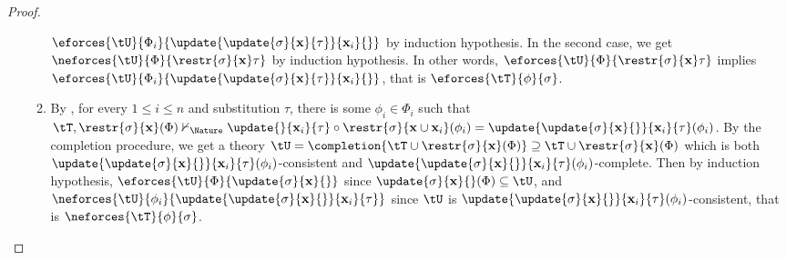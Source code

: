 \begin{proof}
\begin{itemize}
\begin{enumerate}
      $\eforces{\tU}{\Phi_i}{\update{\update{\sigma}{\mathbf{x}}{\tau}}{\mathbf{x}_i}{}}$
      by induction hypothesis. In the second case, we get
      $\neforces{\tU}{\Phi}{\restr{\sigma}{\mathbf{x}}\tau}$ by induction
      hypothesis. In other words,
      $\eforces{\tU}{\Phi}{\restr{\sigma}{\mathbf{x}}\tau}$ implies
      $\eforces{\tU}{\Phi_i}{\update{\update{\sigma}{\mathbf{x}}{\tau}}{\mathbf{x}_i}{}}$,
      that is $\eforces{\tT}{\phi}{\sigma}$.
      \item By , for every $1 \leq i \leq n$ and
      substitution $\tau$, there is some $\phi_i \in \Phi_i$ such that $\tT,
      \restr{\sigma}{\mathbf{x}}(\Phi) \nvdash_\Nature
      \update{}{\mathbf{x}_i}{\tau} \circ \restr{\sigma}{\mathbf{x} \cup
      \mathbf{x}_i}(\phi_i) =
      \update{\update{\sigma}{\mathbf{x}}{}}{\mathbf{x}_i}{\tau}(\phi_i)$. By
      the completion procedure, we get a theory $\tU = \completion{\tT \cup
      \restr{\sigma}{\mathbf{x}}(\Phi)} \supseteq \tT \cup
      \restr{\sigma}{\mathbf{x}}(\Phi)$ which is both
      $\update{\update{\sigma}{\mathbf{x}}{}}{\mathbf{x}_i}{\tau}(\phi_i)$-consistent
      and
      $\update{\update{\sigma}{\mathbf{x}}{}}{\mathbf{x}_i}{\tau}(\phi_i)$-complete.
      Then by induction hypothesis,
      $\eforces{\tU}{\Phi}{\update{\sigma}{\mathbf{x}}{}}$ since
      $\update{\sigma}{\mathbf{x}}{}(\Phi) \subseteq \tU$, and
      $\neforces{\tU}{\phi_i}{\update{\update{\sigma}{\mathbf{x}}{}}{\mathbf{x}_i}{\tau}}$
      since $\tU$ is
      $\update{\update{\sigma}{\mathbf{x}}{}}{\mathbf{x}_i}{\tau}(\phi_i)$-consistent,
      that is $\neforces{\tT}{\phi}{\sigma}$.
    \end{enumerate}
  \end{itemize}
\end{proof}

